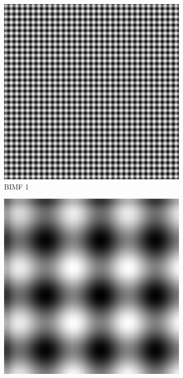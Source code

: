 \begin{figure}
\centering
\begin{subfigure}{.30\textwidth}
  \centering
  \includegraphics[width=.9\linewidth]{img/s_5_4_1}
  \caption{BIMF 1}
\end{subfigure}
\begin{subfigure}{.30\textwidth}
  \centering
  \includegraphics[width=.9\linewidth]{img/s_5_4_2}

\end{subfigure}
\end{figure}
